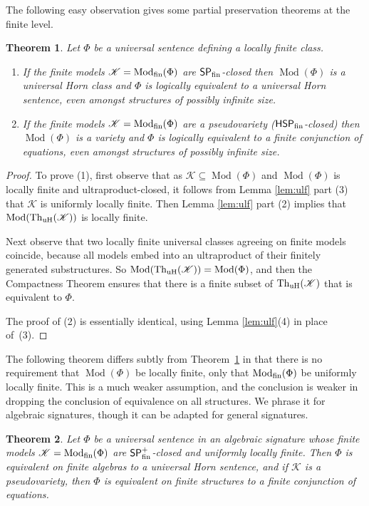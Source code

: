 \documentclass[10pt,a4paper]{amsart}
\theoremstyle{plain}
\newtheorem{thm}{Theorem}[section]
\theoremstyle{definition}
\newcommand{\up}[1]{\textup{#1}}
\newcommand{\Mod}{\operatorname{Mod}}
\newcommand{\Th}{\operatorname{Th}}
\begin{document}
The following easy observation gives some partial preservation theorems at the finite level.
\begin{thm}\label{thm:Aequation}
Let $\Phi$ be a {universal} sentence defining a locally finite class.
\begin{enumerate}
\item If the finite models $\mathscr{K}=\Mod_{\rm fin}(\Phi)$ are
$\mathsf{SP}_{\rm fin}$-closed then $\Mod(\Phi)$ is a universal Horn class and $\Phi$ is logically equivalent to a universal Horn sentence, even amongst structures of possibly infinite size.
\item If the finite models $\mathscr{K}=\Mod_{\rm fin}(\Phi)$ are a pseudovariety \up($\mathsf{HSP}_{\rm fin}$-closed\up) then $\Mod(\Phi)$ is a variety and $\Phi$ is logically equivalent to a finite conjunction of equations, even amongst structures of possibly infinite size.
\end{enumerate}
\end{thm}
\begin{proof}
To prove (1), first observe that as $\mathscr{K}\subseteq \Mod(\Phi)$ and $\Mod(\Phi)$ is locally finite and ultra\-product-closed, it follows from Lemma \ref{lem:ulf} part (3) that $\mathscr{K}$ is uniformly locally finite.   
Then Lemma \ref{lem:ulf} part (2) implies that $\Mod(\Th_{\rm uH}(\mathscr{K}))$ is locally finite.  

Next observe that two locally finite universal classes agreeing on finite models coincide, because all models embed into an ultraproduct of their finitely generated substructures.  So $\Mod(\Th_{\rm uH}(\mathscr{K}))=\Mod(\Phi)$, and then the Compactness Theorem  ensures that there is a finite subset of $\Th_{\rm uH}(\mathscr{K})$ that is equivalent to $\Phi$.

The proof of (2) is essentially identical, using Lemma \ref{lem:ulf}(4) in place of~(3).
\end{proof}
The following theorem differs subtly from Theorem~\ref{thm:Aequation} in that there is no requirement that $\Mod(\Phi)$ be locally finite, only that $\Mod_{\rm fin}(\Phi)$ be uniformly locally finite.  
This is a much weaker assumption, and the conclusion is weaker in dropping the conclusion of equivalence on all structures.
We phrase it for algebraic signatures, though it can be adapted for general signatures.
\begin{thm}\label{thm:Aequation2}
Let $\Phi$ be a universal sentence in an algebraic signature whose finite models $\mathscr{K}=\Mod_{\rm fin}(\Phi)$ are $\mathsf{SP}_{\rm fin}^+$-closed and uniformly locally finite.
Then $\Phi$ is equivalent on finite algebras to a universal Horn sentence, and if $\mathscr{K}$ is a pseudovariety, then $\Phi$ is equivalent on finite structures to a finite conjunction of equations.
\end{thm}
\end{document}
